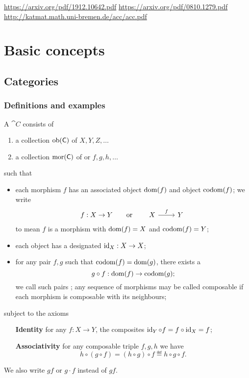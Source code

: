 \url{https://arxiv.org/pdf/1912.10642.pdf}
\url{https://arxiv.org/pdf/0810.1279.pdf}
\url{http://katmat.math.uni-bremen.de/acc/acc.pdf}

\chapter{Basic concepts}
\section{Categories}
\subsection{Definitions and examples}
\begin{definition}
A  $\cat{C}$ consists of
\begin{enumerate}
\item a collection $\operatorname{ob}(\mathsf{C})$ of  $X,Y,Z,\ldots$
\item a collection $\operatorname{mor}(\mathsf{C})$ of  or  $f,g,h,\ldots$
\end{enumerate}
such that
\begin{itemize}
\item each morphism $f$ has an associated  object $\operatorname{dom}(f)$ and  object $\operatorname{codom}(f)$; we write
\[ f: X \to Y \qquad\text{or}\qquad \begin{tikzcd}
X \rar{f} & Y
\end{tikzcd}  \]
to mean $f$ is a morphism with $\operatorname{dom}(f) = X$ and $\operatorname{codom}(f) = Y$;
\item each object has a designated  $\operatorname{id}_X: X\to X$;
\item for any pair $f,g$ such that $\operatorname{codom}(f) = \operatorname{dom}(g)$, there exists a 
\[ g\circ f: \operatorname{dom}(f) \to \operatorname{codom}(g); \]
we call such pairs ; any sequence of morphisms may be called composable if each morphism is composable with its neighbours;
\end{itemize}
subject to the axioms
\begin{itemize}[leftmargin=3cm]
\item[\textbf{Identity}] for any $f: X\to Y$, the composites $\operatorname{id}_Y\circ f = f\circ \operatorname{id}_X = f$;
\item[\textbf{Associativity}] for any composable triple $f,g,h$ we have
\[ h\circ (g\circ f) = (h\circ g)\circ f \eqdef h\circ g \circ f. \]
\end{itemize}
We also write $gf$ or $g\cdot f$ instead of $gf$.
\end{definition}

